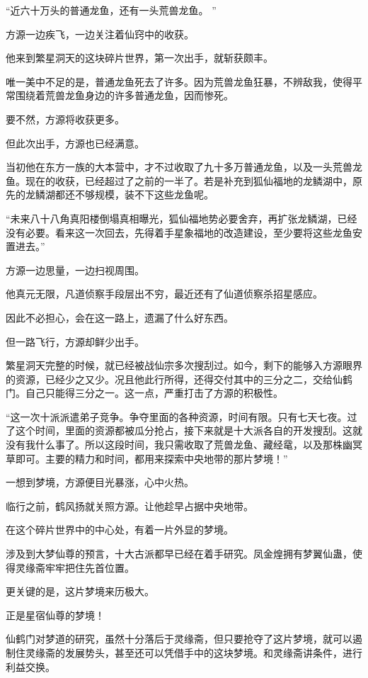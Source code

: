 
\begin{this_body}

“近六十万头的普通龙鱼，还有一头荒兽龙鱼。 ”

方源一边疾飞，一边关注着仙窍中的收获。

他来到繁星洞天的这块碎片世界，第一次出手，就斩获颇丰。

唯一美中不足的是，普通龙鱼死去了许多。因为荒兽龙鱼狂暴，不辨敌我，使得平常围绕着荒兽龙鱼身边的许多普通龙鱼，因而惨死。

要不然，方源将收获更多。

但此次出手，方源也已经满意。

当初他在东方一族的大本营中，才不过收取了九十多万普通龙鱼，以及一头荒兽龙鱼。现在的收获，已经超过了之前的一半了。若是补充到狐仙福地的龙鳞湖中，原先的龙鳞湖都还不够规模，装不下这些龙鱼呢。

“未来八十八角真阳楼倒塌真相曝光，狐仙福地势必要舍弃，再扩张龙鳞湖，已经没有必要。看来这一次回去，先得着手星象福地的改造建设，至少要将这些龙鱼安置进去。”

方源一边思量，一边扫视周围。

他真元无限，凡道侦察手段层出不穷，最近还有了仙道侦察杀招星感应。

因此不必担心，会在这一路上，遗漏了什么好东西。

但一路飞行，方源却鲜少出手。

繁星洞天完整的时候，就已经被战仙宗多次搜刮过。如今，剩下的能够入方源眼界的资源，已经少之又少。况且他此行所得，还得交付其中的三分之二，交给仙鹤门。自己只能得三分之一。这一点，严重打击了方源的积极性。

“这一次十派派遣弟子竞争。争夺里面的各种资源，时间有限。只有七天七夜。过了这个时间，里面的资源都被瓜分抢占，接下来就是十大派各自的开发搜刮。这就没有我什么事了。所以这段时间，我只需收取了荒兽龙鱼、藏经鼋，以及那株幽冥草即可。主要的精力和时间，都用来探索中央地带的那片梦境！”

一想到梦境，方源便目光暴涨，心中火热。

临行之前，鹤风扬就关照方源。让他趁早占据中央地带。

在这个碎片世界中的中心处，有着一片外显的梦境。

涉及到大梦仙尊的预言，十大古派都早已经在着手研究。凤金煌拥有梦翼仙蛊，使得灵缘斋牢牢把住先首位置。

更关键的是，这片梦境来历极大。

正是星宿仙尊的梦境！

仙鹤门对梦道的研究，虽然十分落后于灵缘斋，但只要抢夺了这片梦境，就可以遏制住灵缘斋的发展势头，甚至还可以凭借手中的这块梦境。和灵缘斋讲条件，进行利益交换。


\end{this_body}
